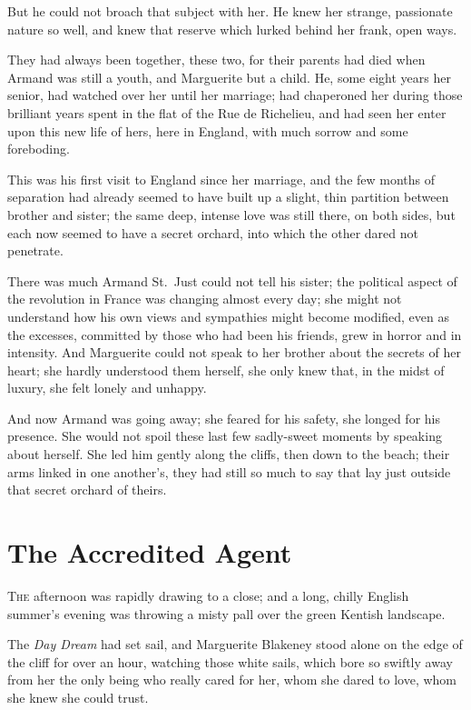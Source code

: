 \documentclass[paper=a5,BCOR=7mm,twoside,DIV=calc,12pt,usegeometry,chapterprefix,endperiod,headings=big]{scrbook}
\begin{document}
But he could not broach that subject with her. He knew her strange, passionate nature so well, and knew that reserve which lurked behind her frank, open ways.

They had always been together, these two, for their parents had died when Armand was still a youth, and Marguerite but a child. He, some eight years her senior, had watched over her until her marriage; had chaperoned her during those brilliant years spent in the flat of the Rue de Richelieu, and had seen her enter upon this new life of hers, here in England, with much sorrow and some foreboding.

This was his first visit to England since her marriage, and the few months of separation had already seemed to have built up a slight, thin partition between brother and sister; the same deep, intense love was still there, on both sides, but each now seemed to have a secret orchard, into which the other dared not penetrate.

There was much Armand St.~Just could not tell his sister; the political aspect of the revolution in France was changing almost every day; she might not understand how his own views and sympathies might become modified, even as the excesses, committed by those who had been his friends, grew in horror and in intensity. And Marguerite could not speak to her brother about the secrets of her heart; she hardly understood them herself, she only knew that, in the midst of luxury, she felt lonely and unhappy.

And now Armand was going away; she feared for his safety, she longed for his presence. She would not spoil these last few sadly-sweet moments by speaking about herself. She led him gently along the cliffs, then down to the beach; their arms linked in one another's, they had still so much to say that lay just outside that secret orchard of theirs.

\chapter{The Accredited Agent}
\lettrine[lines=4]{T}{he} afternoon was rapidly drawing to a close; and a long, chilly English summer's evening was throwing a misty pall over the green Kentish landscape.

The \textit{\textit{Day Dream}} had set sail, and Marguerite Blakeney stood alone on the edge of the cliff for over an hour, watching those white sails, which bore so swiftly away from her the only being who really cared for her, whom she dared to love, whom she knew she could trust.
\end{document}

